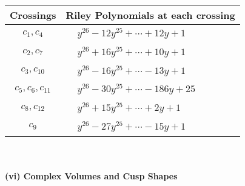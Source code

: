 \documentclass[1p]{elsarticle_modified}
\theoremstyle{definition}
\begin{document}
\begin{tabular}{m{50pt}|m{274pt}}
Crossings & \hspace{64pt}Riley Polynomials at each crossing \\
\hline $$\begin{aligned}c_{1},c_{4}\end{aligned}$$&$\begin{aligned}
&y^{26}-12 y^{25}+\cdots+12 y+1
\end{aligned}$\\
\hline $$\begin{aligned}c_{2},c_{7}\end{aligned}$$&$\begin{aligned}
&y^{26}+16 y^{25}+\cdots+10 y+1
\end{aligned}$\\
\hline $$\begin{aligned}c_{3},c_{10}\end{aligned}$$&$\begin{aligned}
&y^{26}-16 y^{25}+\cdots-13 y+1
\end{aligned}$\\
\hline $$\begin{aligned}c_{5},c_{6},c_{11}\end{aligned}$$&$\begin{aligned}
&y^{26}-30 y^{25}+\cdots-186 y+25
\end{aligned}$\\
\hline $$\begin{aligned}c_{8},c_{12}\end{aligned}$$&$\begin{aligned}
&y^{26}+15 y^{25}+\cdots+2 y+1
\end{aligned}$\\
\hline $$\begin{aligned}c_{9}\end{aligned}$$&$\begin{aligned}
&y^{26}-27 y^{25}+\cdots-15 y+1
\end{aligned}$\\
\hline
\end{tabular}\\~\\
\newpage\flushleft \textbf{(vi) Complex Volumes and Cusp Shapes}
\end{document}
